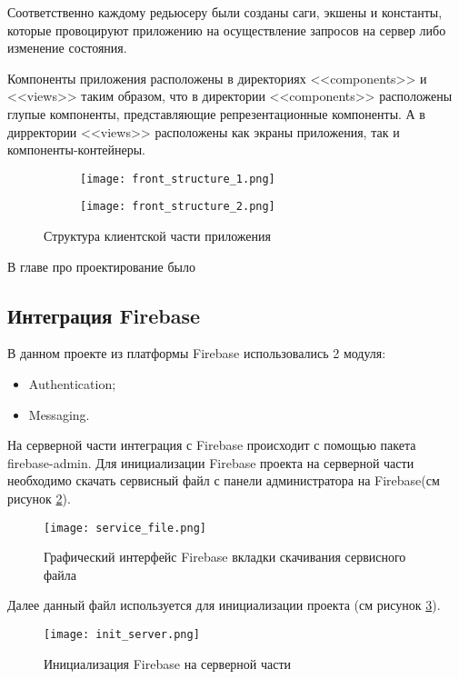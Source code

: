 Соответственно каждому редьюсеру были созданы саги, экшены и константы, которые провоцируют приложению на осуществление запросов на сервер либо изменение состояния.

Компоненты приложения расположены в директориях <<components>> и <<views>> таким образом, что в директории <<components>> расположены глупые компоненты, представляющие репрезентационные компоненты.
А в дирректории <<views>> расположены как экраны приложения, так и компоненты-контейнеры.
\begin{figure}[h]
    \begin{subfigure}[b]{0.45\textwidth}
    \centering
    \texttt{[image: front\_structure\_1.png]}
    \caption{}
    \end{subfigure}
    \begin{subfigure}[b]{0.3\textwidth}
    \centering
    \texttt{[image: front\_structure\_2.png]}
    \caption{}
    \end{subfigure}
    \caption{ Структура клиентской части приложения }
    \label{front:struct}
\end{figure}

В главе про проектирование было


\subsection{Интеграция Firebase}
В данном проекте из платформы Firebase использовались 2 модуля:
\begin{itemize}
    \item Authentication;
    \item Messaging.
\end{itemize}

На серверной части интеграция с Firebase происходит с помощью пакета firebase-admin.
Для инициализации Firebase проекта на серверной части необходимо скачать сервисный файл с панели администратора на Firebase(см рисунок \ref{fire:admin}).

\begin{figure}[ht]
    \centering
    \texttt{[image: service\_file.png]}
    \caption{ Графический интерфейс Firebase вкладки скачивания сервисного файла }
    \label{fire:admin}
\end{figure}

Далее данный файл используется для инициализации проекта (см рисунок \ref{fire:server:init}).

\begin{figure}[ht]
    \centering
    \texttt{[image: init\_server.png]}
    \caption{ Инициализация Firebase на серверной части }
    \label{fire:server:init}
\end{figure}

